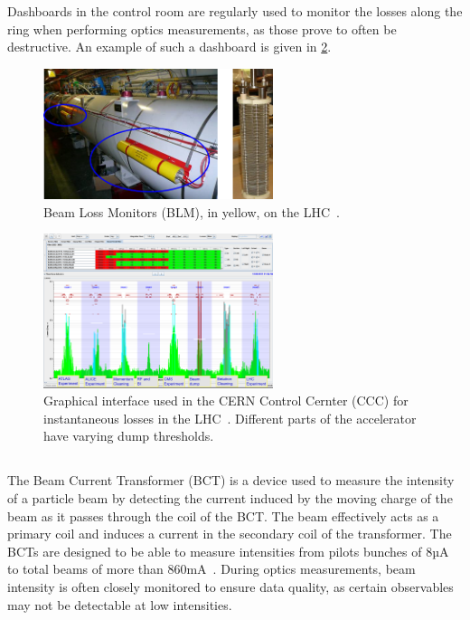 Dashboards in the control room are regularly used to monitor the losses along the ring when
performing optics measurements, as those prove to often be destructive. An example of such a
dashboard is given in \cref{fig:beam_instrumentation:blm2}.

\begin{figure}[H]
    \centering
    \includegraphics[width=0.6\textwidth]{images/blm.png}
    \caption{Beam Loss Monitors (BLM), in yellow, on the LHC~\cite{schmidt_machine_2014}.}
    \label{fig:beam_instrumentation:blm1}
\end{figure}

\begin{figure}[H]
    \centering
    \includegraphics[width=0.6\textwidth]{images/blm2.png}
    \caption{Graphical interface used in the CERN Control Cernter (CCC) for instantaneous losses in
    the LHC~\cite{schmidt_machine_2014}. Different parts of the accelerator have varying dump
    thresholds.}
    \label{fig:beam_instrumentation:blm2}
\end{figure}


\subsection{}

The Beam Current Transformer (BCT) is a device used to measure the intensity of a particle beam by
detecting the current induced by the moving charge of the beam as it passes through the coil of the
BCT. The beam effectively acts as a primary coil and induces a current in the secondary coil of the
transformer.
The BCTs are designed to be able to measure intensities from pilots bunches of 8µA to total beams of
more than 860mA~\cite{odier_dcct_2009}. During optics measurements, beam intensity is often closely
monitored to ensure data quality, as certain observables may not be detectable at low intensities.

